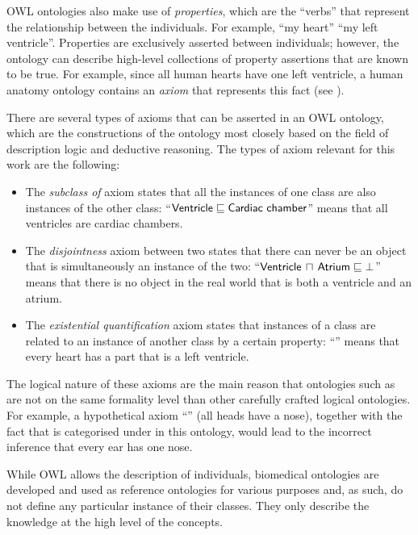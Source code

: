 OWL ontologies also make use of \emph{properties}, which are the ``verbs'' that represent the relationship between the individuals. For example, ``my heart''  ``my left ventricle''. Properties are exclusively asserted between individuals; however, the ontology can describe high-level collections of property assertions that are known to be true. For example, since all human hearts have one left ventricle, a human anatomy ontology contains an \emph{axiom} that represents this fact (see ).

There are several types of axioms that can be asserted in an OWL ontology, which are the constructions of the ontology most closely based on the field of description logic and deductive reasoning. The types of axiom relevant for this work are the following:
\begin{itemize}
    \item The \emph{subclass of} axiom states that all the instances of one class are also instances of the other class: \eg ``$\protect\textsf{Ventricle} \sqsubseteq \protect\textsf{Cardiac chamber}$'' means that all ventricles are cardiac chambers.
    \item The \emph{disjointness} axiom between two states that there can never be an object that is simultaneously an instance of the two: \eg ``$\protect\textsf{Ventricle} \,\sqcap\, \protect\textsf{Atrium} \sqsubseteq \bot$'' means that there is no object in the real world that is both a ventricle and an atrium.
    \item The \emph{existential quantification} axiom states that instances of a class are related to an instance of another class by a certain property: \eg ``'' means that every heart has a part that is a left ventricle.
\end{itemize}

The logical nature of these axioms are the main reason that ontologies such as  are not on the same formality level than other carefully crafted logical ontologies. For example, a hypothetical axiom ``'' (all heads have a nose), together with the fact that  is categorised under  in this ontology, would lead to the incorrect inference that every ear has one nose.

While OWL allows the description of individuals, biomedical ontologies are developed and used as reference ontologies for various purposes and, as such, do not define any particular instance of their classes. They only describe the knowledge at the high level of the concepts.

